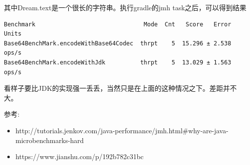 \documentclass[12pt]{article}
\begin{document}
其中Dream.text是一个很长的字符串。执行gradle的jmh task之后，可以得到结果

\begin{verbatim}
Benchmark                               Mode  Cnt   Score   Error  Units
Base64BenchMark.encodeWithBase64Codec  thrpt    5  15.296 ± 2.538  ops/s
Base64BenchMark.encodeWithJdk          thrpt    5  13.029 ± 1.563  ops/s
\end{verbatim}

看样子要比JDK的实现强一丢丢，当然只是在上面的这种情况之下。差距并不大。

参考:

\begin{itemize}
\tightlist
\item
  http://tutorials.jenkov.com/java-performance/jmh.html\#why-are-java-microbenchmarks-hard
\item
  https://www.jianshu.com/p/192b782c31bc
\end{itemize}
\end{document}

